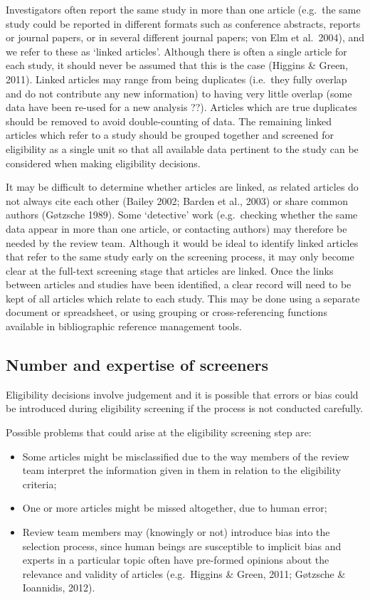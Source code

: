 \documentclass[
  letterpaper,
  DIV=11,
  numbers=noendperiod]{scrreprt}
\begin{document}
Investigators often report the same study in more than one article
(e.g.~the same study could be reported in different formats such as
conference abstracts, reports or journal papers, or in several different
journal papers; von Elm et al.~2004), and we refer to these as `linked
articles'. Although there is often a single article for each study, it
should never be assumed that this is the case (Higgins \& Green, 2011).
Linked articles may range from being duplicates (i.e.~they fully overlap
and do not contribute any new information) to having very little overlap
(some data have been re-used for a new analysis ??). Articles which are
true duplicates should be removed to avoid double-counting of data. The
remaining linked articles which refer to a study should be grouped
together and screened for eligibility as a single unit so that all
available data pertinent to the study can be considered when making
eligibility decisions.

It may be difficult to determine whether articles are linked, as related
articles do not always cite each other (Bailey 2002; Barden et al.,
2003) or share common authors (Gøtzsche 1989). Some `detective' work
(e.g.~checking whether the same data appear in more than one article, or
contacting authors) may therefore be needed by the review team. Although
it would be ideal to identify linked articles that refer to the same
study early on the screening process, it may only become clear at the
full-text screening stage that articles are linked. Once the links
between articles and studies have been identified, a clear record will
need to be kept of all articles which relate to each study. This may be
done using a separate document or spreadsheet, or using grouping or
cross-referencing functions available in bibliographic reference
management tools.

\subsection{Number and expertise of
screeners}\label{number-and-expertise-of-screeners-1}

Eligibility decisions involve judgement and it is possible that errors
or bias could be introduced during eligibility screening if the process
is not conducted carefully.

Possible problems that could arise at the eligibility screening step
are:

\begin{itemize}
\item
  Some articles might be misclassified due to the way members of the
  review team interpret the information given in them in relation to the
  eligibility criteria;
\item
  One or more articles might be missed altogether, due to human error;
\item
  Review team members may (knowingly or not) introduce bias into the
  selection process, since human beings are susceptible to implicit bias
  and experts in a particular topic often have pre-formed opinions about
  the relevance and validity of articles (e.g.~Higgins \& Green, 2011;
  Gøtzsche \& Ioannidis, 2012).
\end{itemize}
\end{document}
